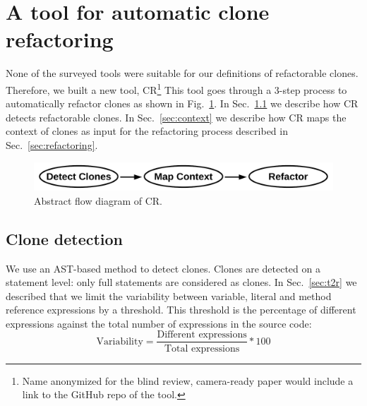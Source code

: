 \documentclass[a4paper,UKenglish,cleveref, autoref, thm-restate,authorcolumns]{lipics-v2019}
\begin{document}


\section{A tool for automatic clone refactoring}\label{sec:clonerefactor}
None of the surveyed tools were suitable for our definitions of refactorable clones. Therefore, we built a new tool, CR\footnote{Name anonymized for the blind review, camera-ready paper would include a link to the GitHub repo of the tool.} This tool goes through a 3-step process to automatically refactor clones as shown in Fig.~\ref{fig:clonerefactorflow}. In Sec.~\ref{sec:detection} we describe how CR detects refactorable clones. In Sec.~\ref{sec:context} we describe how CR maps the context of clones as input for the refactoring process described in Sec.~\ref{sec:refactoring}.

\begin{figure}[H]
  \includegraphics[width=1\columnwidth]{img/flow}
  \caption{Abstract flow diagram of CR.}
  \label{fig:clonerefactorflow}
\end{figure}

\subsection{Clone detection}\label{sec:detection}
We use an AST-based method to detect clones. Clones are detected on a statement level: only full statements are considered as clones. In Sec.~\ref{sec:t2r} we described that we limit the variability between variable, literal and method reference expressions by a threshold. This threshold is the percentage of different expressions against the total number of expressions in the source code:
\begin{equation}\label{eq:type2r}
\text{Variability}=\frac{\text{Different expressions}}{\text{Total expressions}}*100
\end{equation}
\end{document}
